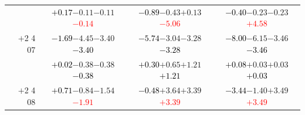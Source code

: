 \documentclass[compress]{beamer}
\begin{document}
\begin{frame}
\begin{tabular}{r | c | c | c}
          & \textcolor{black}{$+0.17$}\hspace{0.1 cm}$-0.11$\hspace{0.1 cm}$-0.11$\hspace{0.1 cm}\textcolor{red}{$-0.14$} & \textcolor{black}{$-0.89$}\hspace{0.1 cm}$-0.43$\hspace{0.1 cm}$+0.13$\hspace{0.1 cm}\textcolor{red}{$-5.06$} & \textcolor{black}{$-0.40$}\hspace{0.1 cm}$-0.23$\hspace{0.1 cm}$-0.23$\hspace{0.1 cm}\textcolor{red}{$+4.58$} \\
$+$2 4 07 & \textcolor{black}{$-1.69$}\hspace{0.1 cm}$-4.45$\hspace{0.1 cm}$-3.40$\hspace{0.1 cm}\textcolor{black}{$-3.40$} & \textcolor{black}{$-5.74$}\hspace{0.1 cm}$-3.04$\hspace{0.1 cm}$-3.28$\hspace{0.1 cm}\textcolor{black}{$-3.28$} & \textcolor{black}{$-8.00$}\hspace{0.1 cm}$-6.15$\hspace{0.1 cm}$-3.46$\hspace{0.1 cm}\textcolor{black}{$-3.46$} \\
          & \textcolor{black}{$+0.02$}\hspace{0.1 cm}$-0.38$\hspace{0.1 cm}$-0.38$\hspace{0.1 cm}\textcolor{black}{$-0.38$} & \textcolor{black}{$+0.30$}\hspace{0.1 cm}$+0.65$\hspace{0.1 cm}$+1.21$\hspace{0.1 cm}\textcolor{black}{$+1.21$} & \textcolor{black}{$+0.08$}\hspace{0.1 cm}$+0.03$\hspace{0.1 cm}$+0.03$\hspace{0.1 cm}\textcolor{black}{$+0.03$} \\
$+$2 4 08 & \textcolor{black}{$+0.71$}\hspace{0.1 cm}$-0.84$\hspace{0.1 cm}$-1.54$\hspace{0.1 cm}\textcolor{red}{$-1.91$} & \textcolor{black}{$-0.48$}\hspace{0.1 cm}$+3.64$\hspace{0.1 cm}$+3.39$\hspace{0.1 cm}\textcolor{red}{$+3.39$} & \textcolor{black}{$-3.44$}\hspace{0.1 cm}$-1.40$\hspace{0.1 cm}$+3.49$\hspace{0.1 cm}\textcolor{red}{$+3.49$} \\

\end{tabular}
\end{frame}
\end{document}
